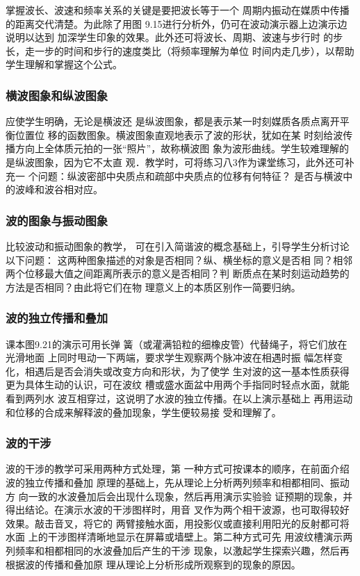 掌握波长、波速和频率关系的关键是要把波长等于一个
周期内振动在媒质中传播的距离交代清楚。为此除了用图
9.15进行分析外，仍可在波动演示器上边演示边说明以达到
加深学生印象的效果。此外还可将波长、周期、波速与步行时
的步长，走一步的时间和步行的速度类比（将频率理解为单位
时间内走几步），以帮助学生理解和掌握这个公式。

\subsubsection{横波图象和纵波图象}

应使学生明确，无论是横波还
是纵波图象，都是表示某一时刻媒质各质点离开平衡位置位
移的函数图象。横波图象直观地表示了波的形状，犹如在某
时刻给波传播方向上全体质元拍的一张“照片”，故称横波图
象为波形曲线。学生较难理解的是纵波图象，因为它不太直
观．教学时，可将练习八3作为课堂练习，此外还可补充一
个问题：纵波密部中央质点和疏部中央质点的位移有何特征？
是否与横波中的波峰和波谷相对应。

\subsubsection{波的图象与振动图象} 

比较波动和振动图象的教学，
可在引入简谐波的概念基础上，引导学生分析讨论以下问题：
这两种图象描述的对象是否相同？纵、横坐标的意义是否相
同？相邻两个位移最大值之间距离所表示的意义是否相同？判
断质点在某时刻运动趋势的方法是否相同？由此将它们在物
理意义上的本质区别作一简要归纳。

\subsubsection{波的独立传播和叠加} 

课本图9.21的演示可用长弹
簧（或灌满铅粒的细橡皮管）代替绳子，将它们放在光滑地面
上同时甩动一下两端，要求学生观察两个脉冲波在相遇时振
幅怎样变化，相遇后是否会消失或改变方向和形状，为了使学
生对波的这一基本性质获得更为具体生动的认识，可在波纹
槽或盛水面盆中用两个手指同时轻点水面，就能看到两列水
波互相穿过，这说明了水波的独立传播。在以上演示基础上
再用运动和位移的合成来解释波的叠加现象，学生便较易接
受和理解了。

\subsubsection{波的干涉} 

波的干涉的教学可采用两种方式处理，第
一种方式可按课本的顺序，在前面介绍波的独立传播和叠加
原理的基础上，先从理论上分析两列频率和相都相同、振动方
向一致的水波叠加后会出现什么现象，然后再用演示实验验
证预期的现象，并得出结论。在演示水波的干涉图样时，用音
叉作为两个相干波源，也可取得较好效果。敲击音叉，将它的
两臂接触水面，用投影仪或直接利用阳光的反射都可将水面
上的干涉图样清晰地显示在屏幕或墙壁上。第二种方式可先
用波纹槽演示两列频率和相都相同的水波叠加后产生的干涉
现象，以激起学生探索兴趣，然后再根据波的传播和叠加原
理从理论上分析形成所观察到的现象的原因。

